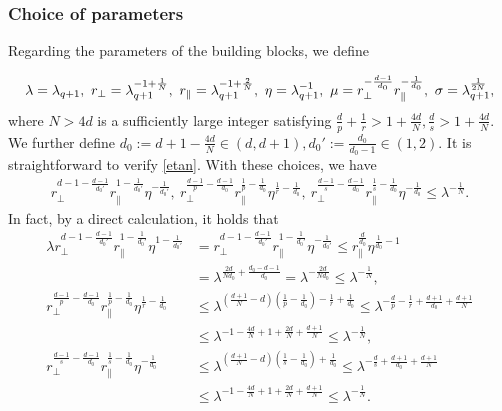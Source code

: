 \documentclass[10pt,a4paper]{amsart}
\numberwithin{equation}{section}
\def\leq{\leqslant}
\def\leq{\leqslant}
\begin{document}
\subsubsection{Choice of parameters}\label{sec:4choicepara}
Regarding the parameters of the building blocks, we define
  
\begin{align}
  \lambda=\lambda_{q+1},\ r_\perp=\lambda_{q+1}^{-1+\frac1{N}},\ r_\parallel=\lambda_{q+1}^{-1+\frac2{N}},\ \eta=\lambda_{q+1}^{-1},\  \mu=r_\perp^{-\frac{d-1}{d_0}}r_\parallel^{-\frac1{d_0}}, \ \sigma=\lambda_{q+1}^{\frac1{2N}}, \notag
\end{align}
where $N>4d$ is a sufficiently large integer satisfying $\frac{d}{p}+\frac{1}{r}>1+\frac{4d}N,\frac{d}{s}>1+\frac{4d}N$. We further define $d_0:=d+1-\frac{4d}{N}\in(d,d+1), d_0':=\frac{d_0}{d_0-1}\in(1,2)$. It is straightforward to verify \eqref{etan}.
With these choices,  we have
\begin{align}
  r_\perp^{d-1-\frac{d-1}{d_0'}} r_\parallel^{1-\frac{1}{d_0'}}\eta^{-\frac{1}{d_0'}},\    r_\perp^{\frac{d-1}{p}-\frac{d-1}{d_0}} r_\parallel^{\frac{1}{p}-\frac{1}{d_0}}\eta^{\frac1r-\frac1{d_0}}, \  r_\perp^{\frac{d-1}{s}-\frac{d-1}{d_0}} r_\parallel^{\frac{1}{s}-\frac{1}{d_0}}\eta^{-\frac1{d_0}} \leq\lambda^{-\frac1N}.\label{bd:paralam4}
\end{align}
 In fact, by a direct calculation, it holds that
    \begin{align*}
        \lambda r_\perp^{d-1-\frac{d-1}{d_0'}}r_\parallel^{1-\frac{1}{d_0'}}\eta^{1-\frac1{d_0'}}&=r_\perp^{d-1-\frac{d-1}{d_0'}} r_\parallel^{1-\frac{1}{d_0'}}\eta^{-\frac{1}{d_0'}}\leq r_\parallel^{\frac{d}{d_0}}\eta^{\frac{1}{d_0}-1}\\
        &= \lambda^{\frac{2d}{Nd_0}+\frac{d_0-d-1}{d_0}}= \lambda^{-\frac{2d}{Nd_0}}\leq \lambda^{-\frac1N},\\
 r_\perp^{\frac{d-1}{p}-\frac{d-1}{d_0}} r_\parallel^{\frac{1}{p}-\frac{1}{d_0}}\eta^{\frac1r-\frac1{d_0}}&\leq  \lambda^{(\frac{d+1}{N}-d)(\frac{1}{p}-\frac{1}{d_0})-\frac1r+\frac1{d_0}}
 \leq\lambda^{-\frac{d}{p}-\frac1r+\frac{d+1}{d_0}+\frac{d+1}{N}}\\
 &\leq \lambda^{-1-\frac{4d}N+1+\frac{2d}{N}+\frac{d+1}{N}}\leq \lambda^{-\frac1N},\\
  r_\perp^{\frac{d-1}{s}-\frac{d-1}{d_0}} r_\parallel^{\frac{1}{s}-\frac{1}{d_0}}\eta^{-\frac1{d_0}}&\leq  \lambda^{(\frac{d+1}{N}-d)(\frac{1}{s}-\frac{1}{d_0})+\frac1{d_0}}
 \leq\lambda^{-\frac{d}{s}+\frac{d+1}{d_0}+\frac{d+1}{N}}\\
 &\leq \lambda^{-1-\frac{4d}N+1+\frac{2d}{N}+\frac{d+1}{N}}\leq \lambda^{-\frac1N}.
    \end{align*}
 
\end{document}
